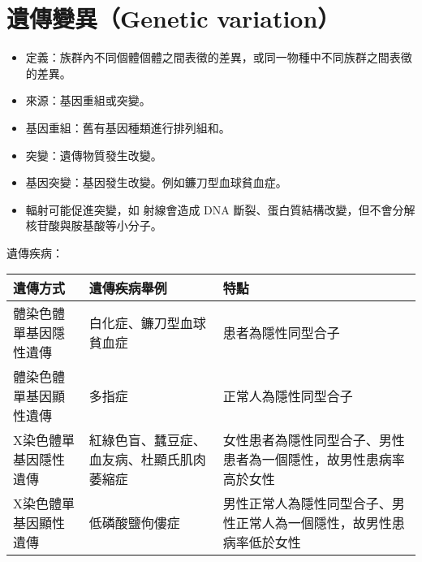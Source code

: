 \documentclass[a4paper,12pt]{report}
\begin{document}
\section{遺傳變異（Genetic variation）}
\begin{itemize}
\item 定義：族群內不同個體個體之間表徵的差異，或同一物種中不同族群之間表徵的差異。
\item 來源：基因重組或突變。
\item 基因重組：舊有基因種類進行排列組和。
\item 突變：遺傳物質發生改變。
\item 基因突變：基因發生改變。例如鐮刀型血球貧血症。
\item 輻射可能促進突變，如 \tx{\textgamma} 射線會造成 DNA 斷裂、蛋白質結構改變，但不會分解核苷酸與胺基酸等小分子。
\end{itemize}
遺傳疾病：
\begin{center}
\begin{tabular}{|p{0.25\tw}|p{0.25\tw}|p{0.3\tw}|}
\hline
遺傳方式 & 遺傳疾病舉例 & 特點 \\ \hline
體染色體單基因隱性遺傳 & 白化症、鐮刀型血球貧血症 & 患者為隱性同型合子 \\ \hline
體染色體單基因顯性遺傳 & 多指症 & 正常人為隱性同型合子 \\ \hline
X染色體單基因隱性遺傳 & 紅綠色盲、蠶豆症、血友病、杜顯氏肌肉萎縮症 & 女性患者為隱性同型合子、男性患者為一個隱性，故男性患病率高於女性 \\ \hline
X染色體單基因顯性遺傳 & 低磷酸鹽佝僂症 & 男性正常人為隱性同型合子、男性正常人為一個隱性，故男性患病率低於女性 \\ \hline
\end{tabular}
\end{center}
\end{document}
